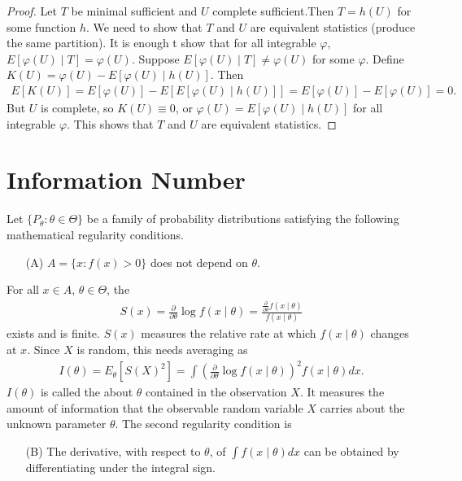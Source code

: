 \begin{proof}
    Let $T$ be minimal sufficient and $U$ complete sufficient.Then $T = h(U)$ for some function $h$. We need to show that $T$ and $U$ are equivalent statistics (produce the same partition). It is enough t show that for all integrable $\varphi$, $E[\varphi(U) \mid T] = \varphi(U)$. Suppose $E[\varphi(U) \mid T] \neq \varphi(U)$ for some $\varphi$. Define $K(U) = \varphi(U) - E[\varphi(U) \mid h(U)]$. Then
    \begin{align}
        E[K(U)] = E[\varphi(U)] - E[E[\varphi(U) \mid h(U)]] = E[\varphi(U)] - E[\varphi(U)] = 0.
    \end{align}
    But $U$ is complete, so $K(U) \equiv 0$, or $\varphi(U) = E[\varphi(U) \mid h(U)]$ for all integrable $\varphi$. This shows that $T$ and $U$ are equivalent statistics.
\end{proof}


\section{Information Number}

Let $\{P_{\theta}:\theta \in \Theta\}$ be a family of probability distributions satisfying the following mathematical regularity conditions.
\begin{enumerate}
    \item[(A)] $A = \{x : f(x) > 0\}$ does not depend on $\theta$.
\end{enumerate}
For all $x \in A$, $\theta \in \Theta$, the 
\begin{align}
    S(x) = \frac{\partial}{\partial \theta} \log f(x \mid \theta) = \frac{\frac{\partial}{\partial \theta} f(x \mid \theta)}{f(x \mid \theta)}
\end{align}
exists and is finite. $S(x)$ measures the relative rate at which $f(x \mid \theta)$ changes at $x$. Since $X$ is random, this needs averaging as
\begin{align}
    I(\theta) = E_{\theta}[S(X)^{2}] = \int \left( \frac{\partial}{\partial \theta} \log f(x \mid \theta) \right)^{2} f(x \mid \theta) dx.
\end{align}
$I(\theta)$ is called the  about $\theta$ contained in the observation $X$. It measures the amount of information that the observable random variable $X$ carries about the unknown parameter $\theta$.
The second regularity condition is
\begin{enumerate}
    \item[(B)] The derivative, with respect to $\theta$, of $\int f(x \mid \theta) dx$ can be obtained by differentiating under the integral sign.
\end{enumerate}

